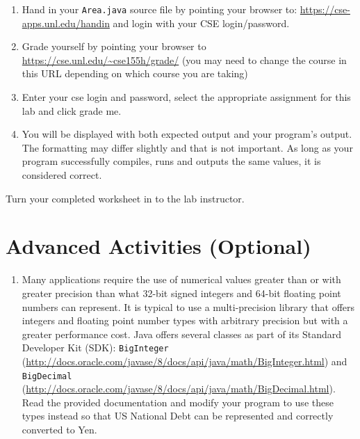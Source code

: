 \documentclass[12pt]{scrartcl}
\begin{document}
\begin{enumerate}
  \item Hand in your \texttt{Area.java} source file by pointing your browser to:
  	\url{https://cse-apps.unl.edu/handin} and login with your CSE 
	login/password.
  \item Grade yourself by pointing your browser to 
  	\url{https://cse.unl.edu/~cse155h/grade/} (you may need to change the course
	in this URL depending on which course you are taking)
  \item Enter your cse login and password, select the appropriate assignment for 
  	this lab and click grade me.
  \item You will be displayed with both expected output and your program's output.  
	The formatting may differ slightly and that is not important.  As long as your 
	program successfully compiles, runs and outputs the same values, it is considered 
	correct.
\end{enumerate}  

Turn your completed worksheet in to the lab instructor.

\section{Advanced Activities (Optional)}

\begin{enumerate}
%

  \item Many applications require the use of numerical values greater than or with 
  	greater precision than what 32-bit signed integers and 64-bit floating point 
	numbers can represent.  It is typical to use a multi-precision library that offers 
	integers and floating point number types with arbitrary precision but with a 
	greater performance cost.  Java offers several classes as part of its Standard 
	Developer Kit (SDK): \texttt{BigInteger} (\url{http://docs.oracle.com/javase/8/docs/api/java/math/BigInteger.html}) 	and \texttt{BigDecimal} (\url{http://docs.oracle.com/javase/8/docs/api/java/math/BigDecimal.html}).  
	Read the provided documentation and modify your program to use these 
	types instead so that US National Debt can be represented and correctly 
	converted to Yen. 
\end{enumerate}
\end{document}

